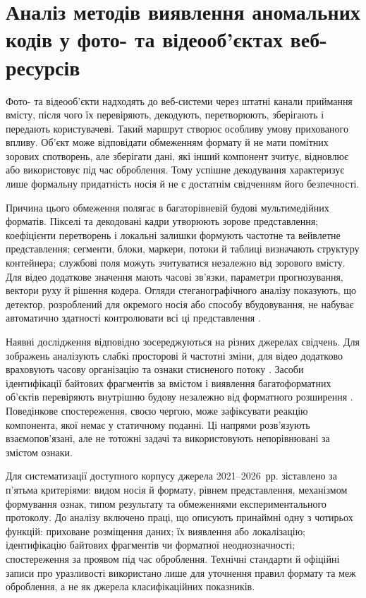 \chapter{Аналіз методів виявлення аномальних кодів у фото- та відеооб’єктах веб-ресурсів}
\label{chap:analysis}

Фото- та відеооб’єкти надходять до веб-системи через штатні канали приймання вмісту, після чого їх перевіряють, декодують, перетворюють, зберігають і передають користувачеві. Такий маршрут створює особливу умову прихованого впливу. Об’єкт може відповідати обмеженням формату й не мати помітних зорових спотворень, але зберігати дані, які інший компонент зчитує, відновлює або використовує під час оброблення. Тому успішне декодування характеризує лише формальну придатність носія й не є достатнім свідченням його безпечності.

Причина цього обмеження полягає в багаторівневій будові мультимедійних форматів. Пікселі та декодовані кадри утворюють зорове представлення; коефіцієнти перетворень і локальні залишки формують частотне та вейвлетне представлення; сегменти, блоки, маркери, потоки й таблиці визначають структуру контейнера; службові поля можуть зчитуватися незалежно від зорового вмісту. Для відео додаткове значення мають часові зв’язки, параметри прогнозування, вектори руху й рішення кодера. Огляди стеганографічного аналізу показують, що детектор, розроблений для окремого носія або способу вбудовування, не набуває автоматично здатності контролювати всі ці представлення \cite{kheddar2024review,apau2024review}.

Наявні дослідження відповідно зосереджуються на різних джерелах свідчень. Для зображень аналізують слабкі просторові й частотні зміни, для відео додатково враховують часову організацію та ознаки стисненого потоку \cite{muralidharan2022race,bouzegza2022video}. Засоби ідентифікації байтових фрагментів за вмістом і виявлення багатоформатних об’єктів перевіряють внутрішню будову незалежно від форматного розширення \cite{mittal2021fifty,koch2022polyglot}. Поведінкове спостереження, своєю чергою, може зафіксувати реакцію компонента, якої немає у статичному поданні. Ці напрями розв’язують взаємопов’язані, але не тотожні задачі та використовують непорівнювані за змістом ознаки.

Для систематизації доступного корпусу джерела 2021--2026~рр. зіставлено за п’ятьма критеріями: видом носія й формату, рівнем представлення, механізмом формування ознак, типом результату та обмеженнями експериментального протоколу. До аналізу включено праці, що описують принаймні одну з чотирьох функцій: приховане розміщення даних; їх виявлення або локалізацію; ідентифікацію байтових фрагментів чи форматної неоднозначності; спостереження за проявом під час оброблення. Технічні стандарти й офіційні записи про уразливості використано лише для уточнення правил формату та меж оброблення, а не як джерела класифікаційних показників.

